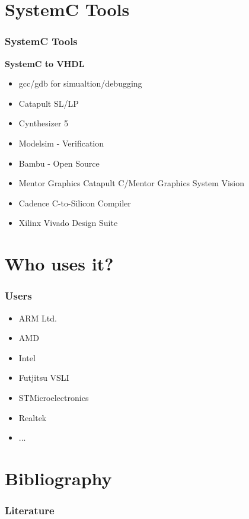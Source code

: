 \documentclass{beamer}
\begin{document}
\section{SystemC Tools}
\begin{frame}\frametitle{SystemC Tools} 
\textbf{SystemC to VHDL}
    \begin{itemize}
      \item{gcc/gdb for simualtion/debugging}
      \item{Catapult SL/LP}
      \item{Cynthesizer 5 }
      \item{Modelsim - Verification}
      \item{Bambu - Open Source}
      \item{Mentor Graphics Catapult C/Mentor Graphics System Vision}
      \item{Cadence C-to-Silicon Compiler}
      \item{Xilinx Vivado Design Suite}
    \end{itemize}
\end{frame}

\section{Who uses it?}
\begin{frame}\frametitle{Users} 
    \begin{itemize}
      \item{ARM Ltd.}
      \item{AMD}
      \item{Intel}
      \item{Futjitsu VSLI}
      \item{STMicroelectronics}
      \item{Realtek}
      \item{...}
    \end{itemize}
\end{frame}
      
\section{Bibliography}
\nocite{haubelt2010digitale}
\begin{frame}\frametitle{Literature} 


\end{frame}
\end{document}
